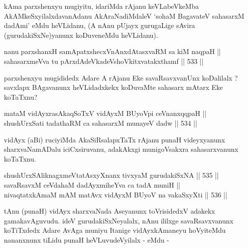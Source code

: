 \begin{artha}
kAma parxshenxyu mugiyitu, idariMda rAjanu keVLabeVkeMba
AkAMkeSxyilalxdavanAdanu AkAraNadiMdaleV `so\s haM BagavateV\break
sahasarxM dadAmi' eMdu heVLidanu, (A nAnu pUjayx gurugaLige sAvira
(gurudakiSxNe)yanunx koDuveneMdu heVLidanu).
\end{artha} 


\begin{shl}
nanu parxshanxH samApatxshecxVnAnxdAtasxvaRM sa kiM naqpaH || \\
sahasarxmeVva tu pArxdAdeVkadeVshoVkitxvatakxthamf \hfill || 533 ||  
\end{shl}

\begin{artha}
parxshenxyu mugididedx Adare A rAjanu Eke savaRsavxvanUnx koDalilalx
? savxlapx BAgavanunx heVLidadxkekx koDuvaMte sahasarx mAtarx Eke
koTaTxnu?
\end{artha}


\begin{shl}
mataM vidAyxrasAkaqSoTxV vidAyxM BUyoV\s pi ceVnanxqqpaH || \\
shushUrxSati tadathaRM ca sahasarxM munayeV dadw \hfill || 534 ||  
\end{shl}

\begin{artha}
vidAyx (aBi) ruciyiMda AkaSiRsalapxTaTx rAjanu punaH videyxyanunx
sharxvaNamADalu iciCxsiruvanu, adakAkxgi munigoVsakxra sahasarxvanunx
koTaTxnu.
\end{artha}


\begin{shl}
shushUrxSAliknagxmeVtatAsxyXnanx tivxyaM gurudakiSxNA \hfill || 535 ||  \\
savaRsavxM ceVdahaM dadAyxmiheYva ca tadA muniH || \\
nivaqtatxkAmaM mAM matAvx vidAyxM BUyoV na vakaSxyXti \hfill || 536 ||  
\end{shl}

\begin{artha}
tAnu (punaH) vidAyx sharxvaNada Aseyanunx toVrisidedxV adakekx
gamakavAguvudu. ideV gurudakiSxNeyalalx, nAnu ililxge savaRsavxvanunx
koTiTxdedx Adare AvAga muniyu Itanige vidAyxkAmaneyu hoVyiteMdu
nananxnunx tiLidu punaH heVLuvudeVyilalx - eMdu -
\end{artha}

